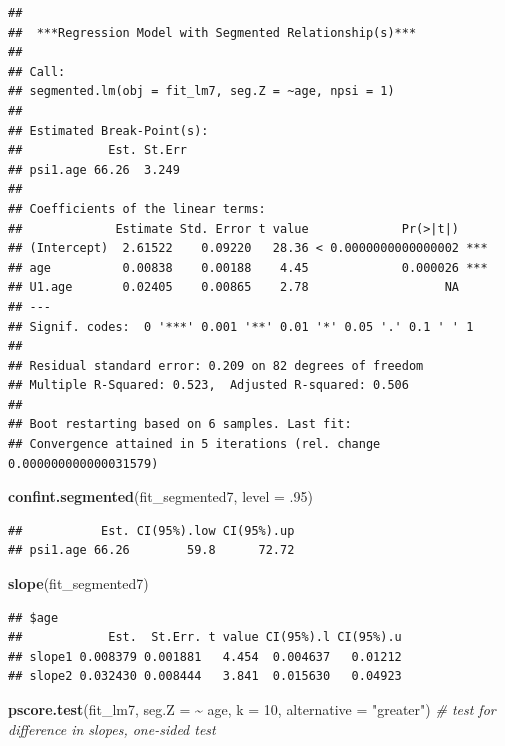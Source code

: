 \documentclass[
]{article}
\newenvironment{Shaded}{\begin{snugshade}}{\end{snugshade}}
\newcommand{\AttributeTok}[1]{\textcolor[rgb]{0.13,0.29,0.53}{#1}}
\newcommand{\CommentTok}[1]{\textcolor[rgb]{0.56,0.35,0.01}{\textit{#1}}}
\newcommand{\DecValTok}[1]{\textcolor[rgb]{0.00,0.00,0.81}{#1}}
\newcommand{\FunctionTok}[1]{\textcolor[rgb]{0.13,0.29,0.53}{\textbf{#1}}}
\newcommand{\NormalTok}[1]{#1}
\newcommand{\SpecialCharTok}[1]{\textcolor[rgb]{0.81,0.36,0.00}{\textbf{#1}}}
\newcommand{\StringTok}[1]{\textcolor[rgb]{0.31,0.60,0.02}{#1}}
\begin{document}
\begin{verbatim}
## 
##  ***Regression Model with Segmented Relationship(s)***
## 
## Call: 
## segmented.lm(obj = fit_lm7, seg.Z = ~age, npsi = 1)
## 
## Estimated Break-Point(s):
##            Est. St.Err
## psi1.age 66.26  3.249
## 
## Coefficients of the linear terms:
##             Estimate Std. Error t value             Pr(>|t|)    
## (Intercept)  2.61522    0.09220   28.36 < 0.0000000000000002 ***
## age          0.00838    0.00188    4.45             0.000026 ***
## U1.age       0.02405    0.00865    2.78                   NA    
## ---
## Signif. codes:  0 '***' 0.001 '**' 0.01 '*' 0.05 '.' 0.1 ' ' 1
## 
## Residual standard error: 0.209 on 82 degrees of freedom
## Multiple R-Squared: 0.523,  Adjusted R-squared: 0.506 
## 
## Boot restarting based on 6 samples. Last fit:
## Convergence attained in 5 iterations (rel. change 0.000000000000031579)
\end{verbatim}

\begin{Shaded}
\begin{Highlighting}[]
\FunctionTok{confint.segmented}\NormalTok{(fit\_segmented7, }\AttributeTok{level =}\NormalTok{ .}\DecValTok{95}\NormalTok{)}
\end{Highlighting}
\end{Shaded}

\begin{verbatim}
##           Est. CI(95%).low CI(95%).up
## psi1.age 66.26        59.8      72.72
\end{verbatim}

\begin{Shaded}
\begin{Highlighting}[]
\FunctionTok{slope}\NormalTok{(fit\_segmented7)}
\end{Highlighting}
\end{Shaded}

\begin{verbatim}
## $age
##            Est.  St.Err. t value CI(95%).l CI(95%).u
## slope1 0.008379 0.001881   4.454  0.004637   0.01212
## slope2 0.032430 0.008444   3.841  0.015630   0.04923
\end{verbatim}

\begin{Shaded}
\begin{Highlighting}[]
\FunctionTok{pscore.test}\NormalTok{(fit\_lm7, }\AttributeTok{seg.Z =} \SpecialCharTok{\textasciitilde{}}\NormalTok{ age, }\AttributeTok{k =} \DecValTok{10}\NormalTok{, }\AttributeTok{alternative =} \StringTok{"greater"}\NormalTok{) }\CommentTok{\# test for difference in slopes, one{-}sided test}
\end{Highlighting}
\end{Shaded}
\end{document}
